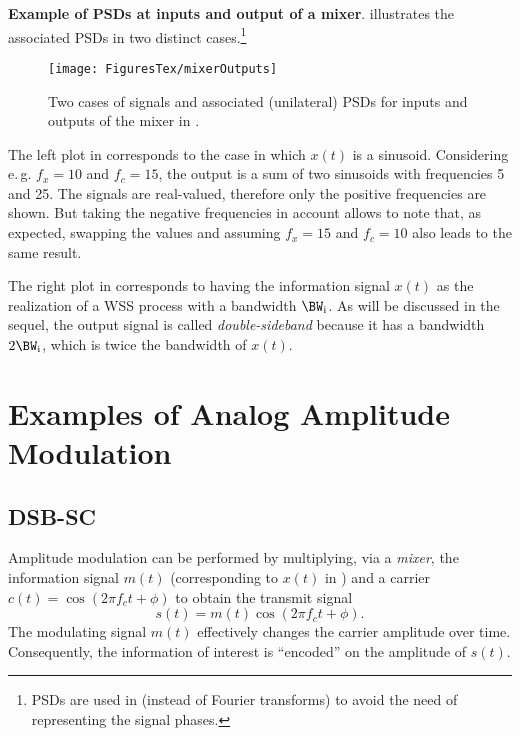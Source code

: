 \bExample \textbf{Example of PSDs at inputs and output of a mixer}.
 illustrates the associated PSDs in two distinct cases.\footnote{PSDs are used in  (instead of Fourier transforms) to avoid the need of representing the signal phases.
}

\begin{figure}[htbp]
\centering
\texttt{[image: FiguresTex/mixerOutputs]}
\caption{Two cases of signals and associated (unilateral) PSDs for inputs and outputs of the mixer in .\label{fig:mixerOutputs}}
\end{figure}

The left plot in  corresponds to the case in which $x(t)$ is a sinusoid.
Considering e.\,g. $f_x=10$ and $f_c=15$, the output is a sum of two sinusoids with frequencies 5 and 25. The signals are real-valued, therefore only the positive frequencies are shown.  But taking the negative frequencies in account allows to note that, as expected, swapping the values and assuming $f_x=15$ and $f_c=10$ also leads to the same result.

The right plot in  corresponds to having the information signal $x(t)$ as the realization of a WSS process with a bandwidth $\BW_{\textrm{i}}$. As will be discussed in the sequel, the output signal is called \emph{double-sideband} because it has a bandwidth $2 \BW_{\textrm{i}}$, which is twice the bandwidth of $x(t)$.
\eExample 


\section{Examples of Analog Amplitude Modulation}
\label{sec:amModulation}

\subsection{DSB-SC}
Amplitude modulation can be performed by multiplying, via a \emph{mixer}, the information signal $m(t)$ (corresponding to $x(t)$ in ) and a carrier $c(t)=\cos(2 \pi f_c t + \phi)$ to obtain the transmit signal
\begin{equation}
s(t) = m(t) \cos(2 \pi f_c t + \phi).
\label{eq:am-dsb}
\end{equation}
The modulating signal $m(t)$ effectively changes the carrier amplitude over time. Consequently, the information of interest is ``encoded'' on the amplitude of $s(t)$.

